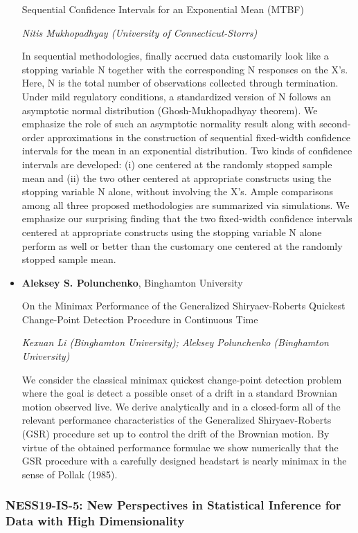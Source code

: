 \begin{itemize}
Sequential Confidence Intervals for an Exponential Mean (MTBF)

\emph{\footnotesize Nitis Mukhopadhyay (University of Connecticut-Storrs)}

In sequential methodologies, finally accrued data customarily look like a stopping variable N together with the corresponding N responses on the X’s. Here, N is the total number of observations collected through termination. Under mild regulatory conditions, a standardized version of N follows an asymptotic normal distribution (Ghosh-Mukhopadhyay theorem). We emphasize the role of such an asymptotic normality result along with second-order approximations in the construction of sequential fixed-width confidence intervals for the mean in an exponential distribution. Two kinds of confidence intervals are developed: (i) one centered at the randomly stopped sample mean and (ii) the two other centered at appropriate constructs using the stopping variable N alone, without involving the X’s. Ample comparisons among all three proposed methodologies are summarized via simulations. We emphasize our surprising finding that the two fixed-width confidence intervals centered at appropriate constructs using the stopping variable N alone perform as well or better than the customary one centered at the randomly stopped sample mean.

\item \textbf{Aleksey S. Polunchenko}, Binghamton University

On the Minimax Performance of the Generalized Shiryaev-Roberts Quickest Change-Point Detection Procedure in Continuous Time

\emph{\footnotesize Kexuan Li (Binghamton University); Aleksey Polunchenko (Binghamton University)}

We consider the classical minimax quickest change-point detection problem where the goal is detect a possible onset of a drift in a standard Brownian motion observed live. We derive analytically and in a closed-form all of the relevant performance characteristics of the Generalized Shiryaev-Roberts (GSR) procedure set up to control the drift of the Brownian motion. By virtue of the obtained performance formulae we show numerically that the GSR procedure with a carefully designed headstart is nearly minimax in the sense of Pollak (1985).

\end{itemize}

\subsubsection*{NESS19-IS-5: New Perspectives in Statistical Inference for Data with High Dimensionality}

